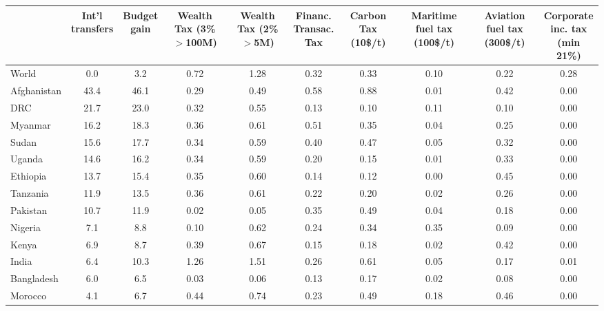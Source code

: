 \documentclass[12pt,english]{article}
\begin{document}
\begin{bibunit}
\begin{table}[!h]
{\begin{tabular}[t]{lccccccccc}
\toprule
  & \makecell{Int'l\\transfers} & \makecell{Budget\\gain} & \makecell{Wealth\\Tax (3\%\\$>$100M)} & \makecell{Wealth\\Tax (2\%\\$>$5M)} & \makecell{Financ.\\Transac.\\Tax} & \makecell{Carbon\\Tax\\(10\$/t)} & \makecell{Maritime\\fuel tax\\(100\$/t)} & \makecell{Aviation\\fuel tax\\(300\$/t)} & \makecell{Corporate\\inc. tax\\(min 21\%)}\\
\midrule
World & 0.0 & 3.2 & 0.72 & 1.28 & 0.32 & 0.33 & 0.10 & 0.22 & 0.28\\
Afghanistan & 43.4 & 46.1 & 0.29 & 0.49 & 0.58 & 0.88 & 0.01 & 0.42 & 0.00\\
DRC & 21.7 & 23.0 & 0.32 & 0.55 & 0.13 & 0.10 & 0.11 & 0.10 & 0.00\\
Myanmar & 16.2 & 18.3 & 0.36 & 0.61 & 0.51 & 0.35 & 0.04 & 0.25 & 0.00\\
Sudan & 15.6 & 17.7 & 0.34 & 0.59 & 0.40 & 0.47 & 0.05 & 0.32 & 0.00\\
Uganda & 14.6 & 16.2 & 0.34 & 0.59 & 0.20 & 0.15 & 0.01 & 0.33 & 0.00\\
Ethiopia & 13.7 & 15.4 & 0.35 & 0.60 & 0.14 & 0.12 & 0.00 & 0.45 & 0.00\\
Tanzania & 11.9 & 13.5 & 0.36 & 0.61 & 0.22 & 0.20 & 0.02 & 0.26 & 0.00\\
Pakistan & 10.7 & 11.9 & 0.02 & 0.05 & 0.35 & 0.49 & 0.04 & 0.18 & 0.00\\
Nigeria & 7.1 & 8.8 & 0.10 & 0.62 & 0.24 & 0.34 & 0.35 & 0.09 & 0.00\\
Kenya & 6.9 & 8.7 & 0.39 & 0.67 & 0.15 & 0.18 & 0.02 & 0.42 & 0.00\\
India & 6.4 & 10.3 & 1.26 & 1.51 & 0.26 & 0.61 & 0.05 & 0.17 & 0.01\\
Bangladesh & 6.0 & 6.5 & 0.03 & 0.06 & 0.13 & 0.17 & 0.02 & 0.08 & 0.00\\
Morocco & 4.1 & 6.7 & 0.44 & 0.74 & 0.23 & 0.49 & 0.18 & 0.46 & 0.00\\

\end{tabular}}
\end{table}
\end{bibunit}
\end{document}
